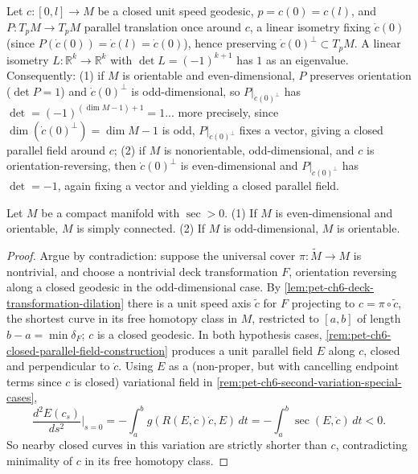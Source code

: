 \begin{remark}
  \label{rem:pet-ch6-closed-parallel-field-construction}
  Let $c:[0,l]\to M$ be a closed unit speed geodesic, $p=c(0)=c(l)$, and
  $P:T_pM\to T_pM$ parallel translation once around $c$, a linear isometry
  fixing $\dot c(0)$ (since $P(\dot c(0))=\dot c(l)=\dot c(0)$), hence
  preserving $\dot c(0)^\perp\subset T_pM$. A linear isometry
  $L:\mathbb{R}^k\to\mathbb{R}^k$ with $\det L=(-1)^{k+1}$ has $1$ as an eigenvalue.
  Consequently: (1) if $M$ is orientable and even-dimensional, $P$ preserves
  orientation ($\det P=1$) and $\dot c(0)^\perp$ is odd-dimensional, so
  $P|_{\dot c(0)^\perp}$ has $\det=(-1)^{(\dim M-1)+1}=1$... more precisely,
  since $\dim(\dot c(0)^\perp)=\dim M-1$ is odd, $P|_{\dot c(0)^\perp}$ fixes
  a vector, giving a closed parallel field around $c$; (2) if $M$ is
  nonorientable, odd-dimensional, and $c$ is orientation-reversing, then
  $\dot c(0)^\perp$ is even-dimensional and $P|_{\dot c(0)^\perp}$ has
  $\det=-1$, again fixing a vector and yielding a closed parallel field.
\end{remark}

\begin{theorem}
  \label{thm:pet-ch6-synge-theorem}
  Let $M$ be a compact manifold with $\sec>0$. (1) If $M$ is even-dimensional
  and orientable, $M$ is simply connected. (2) If $M$ is odd-dimensional,
  $M$ is orientable.
\end{theorem}
\begin{proof}
  Argue by contradiction: suppose the universal cover $\pi:\tilde M\to M$ is
  nontrivial, and choose a nontrivial deck transformation $F$, orientation
  reversing along a closed geodesic in the odd-dimensional case. By
  \cref{lem:pet-ch6-deck-transformation-dilation} there is a unit speed axis
  $\tilde c$ for $F$ projecting to $c=\pi\circ\tilde c$, the shortest curve in
  its free homotopy class in $M$, restricted to $[a,b]$ of length
  $b-a=\min\delta_F$; $c$ is a closed geodesic. In both hypothesis cases,
  \cref{rem:pet-ch6-closed-parallel-field-construction} produces a unit
  parallel field $E$ along $c$, closed and perpendicular to $\dot c$. Using
  $E$ as a (non-proper, but with cancelling endpoint terms since $c$ is
  closed) variational field in
  \cref{rem:pet-ch6-second-variation-special-cases},
  \[
    \frac{d^2E(c_s)}{ds^2}\bigg|_{s=0}
    =-\int_a^bg(R(E,\dot c)\dot c,E)\,dt=-\int_a^b\sec(E,\dot c)\,dt<0.
  \]
  So nearby closed curves in this variation are strictly shorter than $c$,
  contradicting minimality of $c$ in its free homotopy class.
\end{proof}

